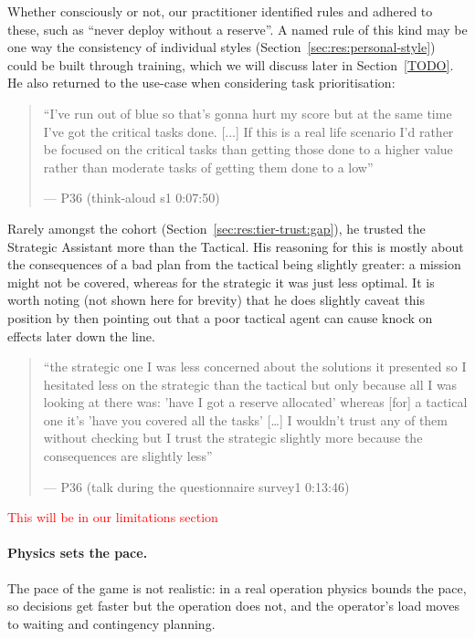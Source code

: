 Whether consciously or not, our practitioner identified rules and adhered to these, such as ``never deploy without a reserve''. A named rule of this kind may be one way the consistency of individual styles (Section~\ref{sec:res:personal-style}) could be built through training, which we will discuss later in Section~\ref{TODO}. He also returned to the use-case when considering task prioritisation:

\begin{quote}\small
``I've run out of blue so that's gonna hurt my score but at the same time I've got the critical tasks done. [...] If this is a real life scenario I'd rather be focused on the critical tasks than getting those done to a higher value rather than moderate tasks of getting them done to a low''\par\hfill--- P36 (think-aloud s1 0:07:50)
\end{quote}

Rarely amongst the cohort (Section~\ref{sec:res:tier-trust:gap}), he trusted the Strategic Assistant more than the Tactical. His reasoning for this is mostly about the consequences of a bad plan from the tactical being slightly greater: a mission might not be covered, whereas for the strategic it was just less optimal. It is worth noting (not shown here for brevity) that he does slightly caveat this position by then pointing out that a poor tactical agent can cause knock on effects later down the line.

\begin{quote}\small
``the strategic one I was less concerned about the solutions it presented so I hesitated less on the strategic than the tactical but only because all I was looking at there was: 'have I got a reserve allocated' whereas [for] a tactical one it's 'have you covered all the tasks' [\ldots{}] I wouldn't trust any of them without checking but I trust the strategic slightly more because the consequences are slightly less''\par\hfill--- P36 (talk during the questionnaire survey1 0:13:46)
\end{quote}

\textcolor{red}{This will be in our limitations section}
\label{sec:qual:practitioner:pt-physics-pace}\paragraph{Physics sets the pace.}
The pace of the game is not realistic: in a real operation physics bounds the pace, so decisions get faster but the operation does not, and the operator's load moves to waiting and contingency planning.

